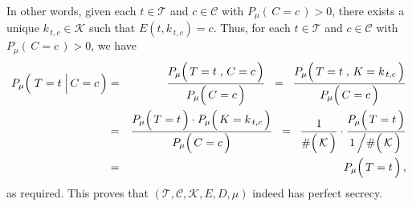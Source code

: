 In other words, given each $t \in \mathcal{T}$ and $c \in \mathcal{C}$ with $P_{\mu}\!\left(\,C = c\,\right) > 0$,
there exists a unique $k_{\,t,c} \in \mathcal{K}$ such that $E(t,k_{\,t,c}) = c$.
Thus, for each $t \in \mathcal{T}$ and $c \in \mathcal{C}$ with $P_{\mu}\!\left(\,C = c\,\right) > 0$, we have
\begin{eqnarray*}
P_{\mu}\!\left(\,\left. T \overset{{\color{white}1}}{=} t \;\right\vert C = c \,\right)
& = &
	\dfrac{
		P_{\mu}\!\left(\, T \overset{{\color{white}1}}{=} t \;,\, C = c \,\right)
		}{
		P_{\mu}\!\left(\, C \overset{{\color{white}1}}{=} c \,\right)
		}
\;\; = \;\;
	\dfrac{
		P_{\mu}\!\left(\, T \overset{{\color{white}1}}{=} t \;,\, K = k_{\,t,c} \,\right)
		}{
		P_{\mu}\!\left(\, C \overset{{\color{white}1}}{=} c \,\right)
		}
\\
& = &
	\dfrac{
		P_{\mu}\!\left(\, T \overset{{\color{white}1}}{=} t \,\right)
		\cdot
		P_{\mu}\!\left(\, K \overset{{\color{white}1}}{=} k_{\,t,c} \,\right)
		}{
		P_{\mu}\!\left(\, C \overset{{\color{white}1}}{=} c \,\right)
		}
\;\; = \;\;
	\dfrac{1}{\#\!\left(\,\overset{{\color{white}.}}{\mathcal{K}}\,\right)}
	\cdot
	\dfrac{
		P_{\mu}\!\left(\, T \overset{{\color{white}1}}{=} t \,\right)
		}{
		1 \left\slash \#\!\left(\,\overset{{\color{white}.}}{\mathcal{K}}\,\right) \right.
		}
\\
& = &
	P_{\mu}\!\left(\, T \overset{{\color{white}1}}{=} t \,\right),
\end{eqnarray*}
as required.
This proves that $(\mathcal{T},\mathcal{C},\mathcal{K},E,D,\mu)$ indeed
has perfect secrecy.


